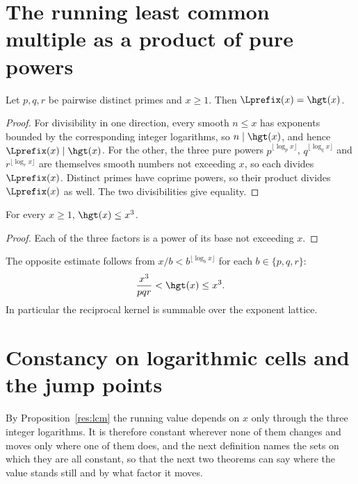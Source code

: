 
\section{The running least common multiple as a product of pure powers}\label{sec:lcm}

\begin{proposition}\label{res:lcm}
Let $p,q,r$ be pairwise distinct primes and $x\ge1$.  Then
$\Lprefix(x)=\hgt(x)$.
\end{proposition}

\begin{proof}
For divisibility in one direction, every smooth $n\le x$ has exponents bounded
by the corresponding integer logarithms, so $n\mid\hgt(x)$, and hence
$\Lprefix(x)\mid\hgt(x)$.  For the other, the three pure powers
$p^{\lfloor\log_p x\rfloor}$, $q^{\lfloor\log_q x\rfloor}$ and
$r^{\lfloor\log_r x\rfloor}$ are themselves smooth numbers not exceeding $x$,
so each divides $\Lprefix(x)$.  Distinct primes have coprime powers, so their
product divides $\Lprefix(x)$ as well.  The two divisibilities give equality.
\end{proof}

\begin{proposition}\label{res:cube}
For every $x\ge1$, $\hgt(x)\le x^{3}$.
\end{proposition}

\begin{proof}
Each of the three factors is a power of its base not exceeding $x$.
\end{proof}

The opposite estimate follows from
$x/b<b^{\lfloor\log_b x\rfloor}$ for each $b\in\{p,q,r\}$:
\[
 \frac{x^3}{pqr}<\hgt(x)\le x^3.
\]
In particular the reciprocal kernel is summable over the exponent lattice.


\section{Constancy on logarithmic cells and the jump points}\label{sec:cells}

By Proposition~\ref{res:lcm} the running value depends on $x$ only through the
three integer logarithms.  It is therefore constant wherever none of them
changes and moves only where one of them does, and the next definition names
the sets on which they are all constant, so that the next two theorems can say
where the value stands still and by what factor it moves.

